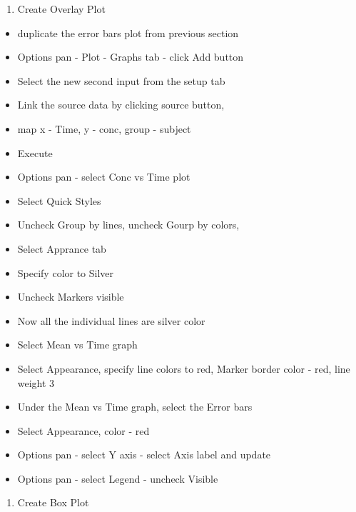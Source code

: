 \documentclass[
  letterpaper,
  DIV=11,
  numbers=noendperiod]{scrreprt}
\providecommand{\tightlist}{%
  \setlength{\itemsep}{0pt}\setlength{\parskip}{0pt}}\usepackage{longtable,booktabs,array}
\begin{document}
\begin{enumerate}
\def\labelenumi{\arabic{enumi}.}
\setcounter{enumi}{5}
\tightlist
\item
  Create Overlay Plot
\end{enumerate}

\begin{itemize}
\item
  duplicate the error bars plot from previous section
\item
  Options pan - Plot - Graphs tab - click Add button
\item
  Select the new second input from the setup tab
\item
  Link the source data by clicking source button,
\item
  map x - Time, y - conc, group - subject
\item
  Execute
\item
  Options pan - select Conc vs Time plot
\item
  Select Quick Styles
\item
  Uncheck Group by lines, uncheck Gourp by colors,
\item
  Select Apprance tab
\item
  Specify color to Silver
\item
  Uncheck Markers visible
\item
  Now all the individual lines are silver color
\item
  Select Mean vs Time graph
\item
  Select Appearance, specify line colors to red, Marker border color -
  red, line weight 3
\item
  Under the Mean vs Time graph, select the Error bars
\item
  Select Appearance, color - red
\item
  Options pan - select Y axis - select Axis label and update
\item
  Options pan - select Legend - uncheck Visible
\end{itemize}

\begin{enumerate}
\def\labelenumi{\arabic{enumi}.}
\setcounter{enumi}{6}
\tightlist
\item
  Create Box Plot
\end{enumerate}
\end{document}
